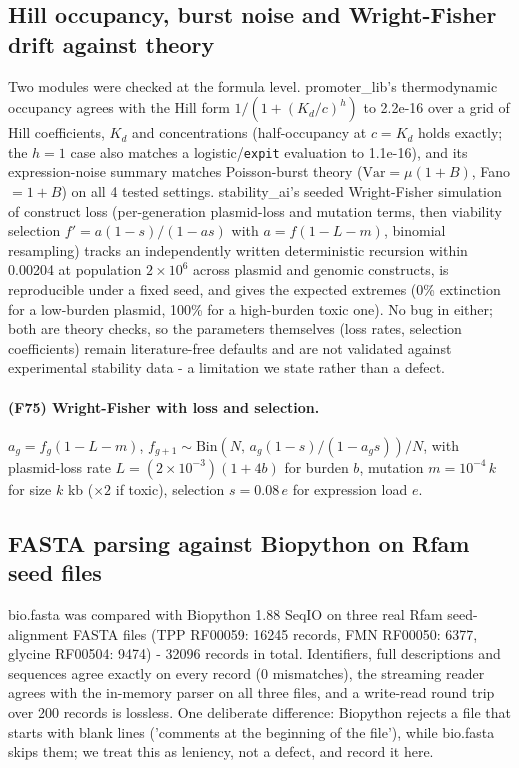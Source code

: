 \subsection{Hill occupancy, burst noise and Wright-Fisher drift against theory}
Two modules were checked at the formula level. promoter\_lib's thermodynamic occupancy agrees with the Hill form $1/(1+(K_d/c)^h)$ to 2.2e-16 over a grid of Hill coefficients, $K_d$ and concentrations (half-occupancy at $c=K_d$ holds exactly; the $h=1$ case also matches a logistic/\texttt{expit} evaluation to 1.1e-16), and its expression-noise summary matches Poisson-burst theory ($\mathrm{Var}=\mu(1+B)$, Fano $=1+B$) on all 4 tested settings. stability\_ai's seeded Wright-Fisher simulation of construct loss (per-generation plasmid-loss and mutation terms, then viability selection $f' = a(1-s)/(1-as)$ with $a=f(1-L-m)$, binomial resampling) tracks an independently written deterministic recursion within 0.00204 at population $2\times10^6$ across plasmid and genomic constructs, is reproducible under a fixed seed, and gives the expected extremes (0\% extinction for a low-burden plasmid, 100\% for a high-burden toxic one). No bug in either; both are theory checks, so the parameters themselves (loss rates, selection coefficients) remain literature-free defaults and are not validated against experimental stability data - a limitation we state rather than a defect.
\paragraph{(F75) Wright-Fisher with loss and selection.} $a_{{g}}=f_g(1-L-m)$, $f_{{g+1}}\sim\mathrm{{Bin}}(N,\,a_{{g}}(1-s)/(1-a_{{g}}s))/N$, with plasmid-loss rate $L=(2\times10^{-3})(1+4b)$ for burden $b$, mutation $m=10^{-4}\,k$ for size $k$ kb ($\times2$ if toxic), selection $s=0.08\,e$ for expression load $e$.
\subsection{FASTA parsing against Biopython on Rfam seed files}
bio.fasta was compared with Biopython 1.88 SeqIO on three real Rfam seed-alignment FASTA files (TPP RF00059: 16245 records, FMN RF00050: 6377, glycine RF00504: 9474) - 32096 records in total. Identifiers, full descriptions and sequences agree exactly on every record (0 mismatches), the streaming reader agrees with the in-memory parser on all three files, and a write-read round trip over 200 records is lossless. One deliberate difference: Biopython rejects a file that starts with blank lines ('comments at the beginning of the file'), while bio.fasta skips them; we treat this as leniency, not a defect, and record it here.
